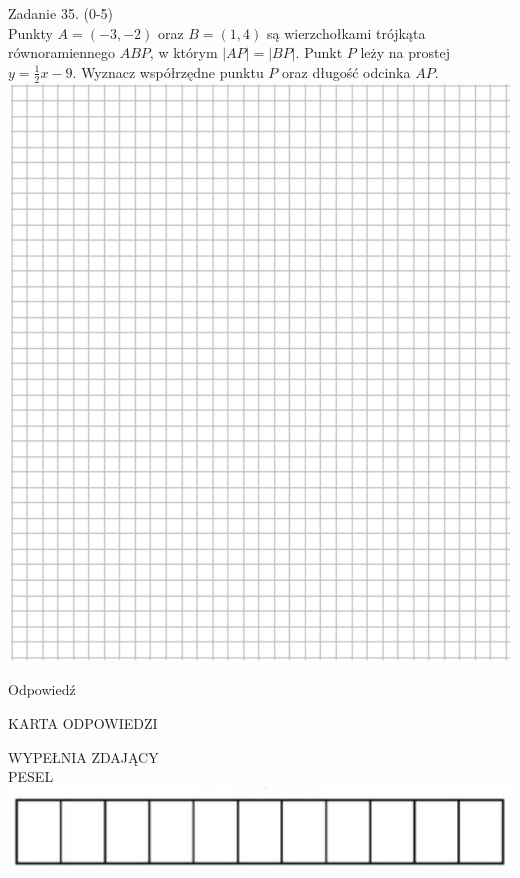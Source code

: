 \documentclass[10pt]{article}
\begin{document}
Zadanie 35. (0-5)\\
Punkty \(A=(-3,-2)\) oraz \(B=(1,4)\) są wierzchołkami trójkąta równoramiennego \(A B P\), w którym \(|A P|=|B P|\). Punkt \(P\) leży na prostej \(y=\frac{1}{2} x-9\). Wyznacz współrzędne punktu \(P\) oraz długość odcinka \(A P\).\\
\includegraphics[max width=\textwidth, center]{2024_11_21_fd555512e32c497e8a5dg-19}

Odpowiedź \(\qquad\)

KARTA ODPOWIEDZI

WYPEŁNIA ZDAJĄCY\\
PESEL\\
\includegraphics[max width=\textwidth, center]{2024_11_21_fd555512e32c497e8a5dg-20}
\end{document}
